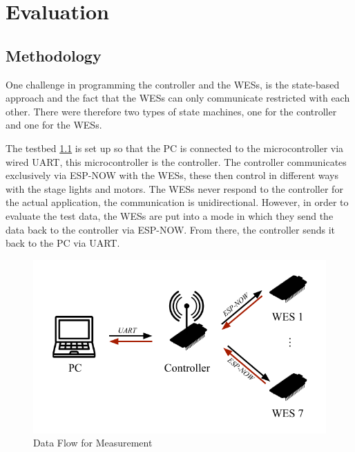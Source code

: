 
\chapter{Evaluation}
\label{sec:evaluation}

\section{Methodology}
One challenge in programming the controller and the WESs,
is the state-based approach and the fact that the WESs can only communicate restricted with each other.
There were therefore two types of state machines, one for the controller and one for the WESs.

The testbed \cref{fig:testbed} is set up so that the PC is connected to the microcontroller 
via wired \ac{UART}, this microcontroller is the controller.
The controller communicates exclusively via ESP-NOW with the WESs,
these then control in different ways with the stage lights and motors.
The WESs never respond to the controller for the actual application, the communication is unidirectional.
However, in order to evaluate the test data, 
the WESs are put into a mode in which they send the data back to the controller via ESP-NOW.
From there, the controller sends it back to the PC via UART.

\begin{figure}[h]
	\centering
	\includegraphics[scale=0.75]{figures/TestFlow.pdf}
	\caption{Data Flow for Measurement}
	\label{fig:testbed}
\end{figure}

